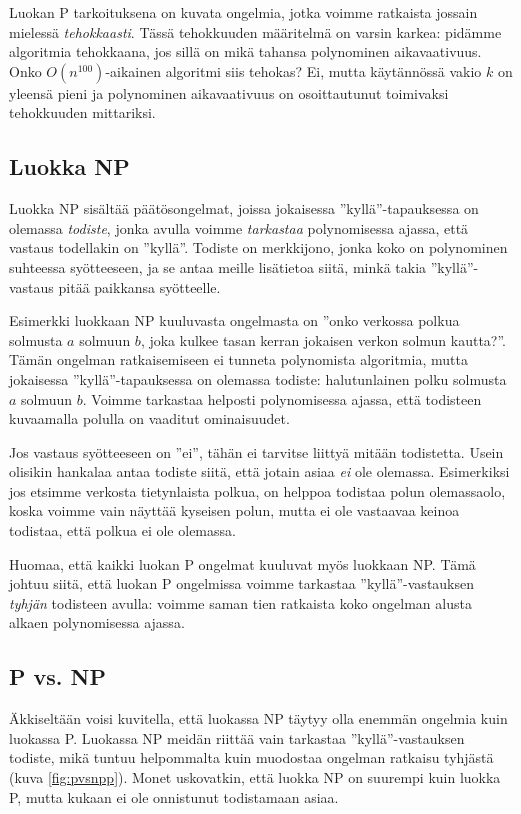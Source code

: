 Luokan P tarkoituksena on kuvata ongelmia, jotka voimme
ratkaista jossain mielessä \emph{tehokkaasti}.
Tässä tehokkuuden määritelmä on varsin karkea:
pidämme algoritmia tehokkaana, jos sillä on mikä tahansa
polynominen aikavaativuus.
Onko $O(n^{100})$-aikainen algoritmi siis tehokas?
Ei, mutta käytännössä vakio $k$ on yleensä pieni ja
polynominen aikavaativuus on osoittautunut
toimivaksi tehokkuuden mittariksi.

\subsection{Luokka NP}

Luokka NP sisältää päätösongelmat, joissa jokaisessa
''kyllä''-tapauksessa on olemassa
\emph{todiste}, jonka avulla voimme
\emph{tarkastaa} polynomisessa ajassa, että vastaus
todellakin on ''kyllä''.
Todiste on merkkijono, jonka koko on polynominen
suhteessa syötteeseen,
ja se antaa meille lisätietoa siitä,
minkä takia ''kyllä''-vastaus pitää paikkansa syötteelle.

Esimerkki luokkaan NP kuuluvasta ongelmasta on
''onko verkossa polkua solmusta $a$ solmuun $b$,
joka kulkee tasan kerran jokaisen verkon solmun kautta?''.
Tämän ongelman ratkaisemiseen ei tunneta polynomista algoritmia,
mutta jokaisessa ''kyllä''-tapauksessa on olemassa todiste:
halutunlainen polku solmusta $a$ solmuun $b$.
Voimme tarkastaa helposti polynomisessa ajassa,
että todisteen kuvaamalla polulla on vaaditut ominaisuudet.

Jos vastaus syötteeseen on ''ei'', tähän ei tarvitse
liittyä mitään todistetta.
Usein olisikin hankalaa antaa todiste siitä, että jotain
asiaa \emph{ei} ole olemassa.
Esimerkiksi jos etsimme verkosta tietynlaista polkua,
on helppoa todistaa polun olemassaolo,
koska voimme vain näyttää kyseisen polun,
mutta ei ole vastaavaa keinoa todistaa, että polkua ei ole olemassa.

Huomaa, että kaikki luokan P ongelmat kuuluvat myös
luokkaan NP. Tämä johtuu siitä, että luokan P ongelmissa
voimme tarkastaa ''kyllä''-vastauksen
\emph{tyhjän} todisteen avulla: voimme saman tien ratkaista
koko ongelman alusta alkaen polynomisessa ajassa.

\subsection{P vs. NP}

Äkkiseltään voisi kuvitella, että luokassa NP täytyy olla
enemmän ongelmia kuin luokassa P.
Luokassa NP meidän riittää vain tarkastaa ''kyllä''-vastauksen
todiste, mikä tuntuu helpommalta kuin muodostaa ongelman ratkaisu tyhjästä (kuva \ref{fig:pvsnpp}).
Monet uskovatkin, että luokka NP on suurempi kuin luokka P,
mutta kukaan ei ole onnistunut todistamaan asiaa.

